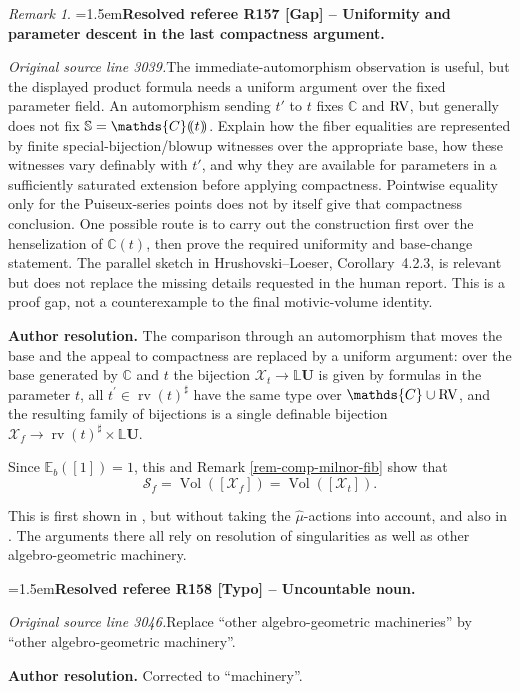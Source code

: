 \documentclass[12pt]{amsart}
\newcommand{\ResolvedRefereeRemark}[5]{%
  \par\medskip\begingroup\normalfont\small\color{gray}%
  \emergencystretch=1.5em\noindent\textbf{Resolved referee R#1 [#2] -- #3.}\par\nobreak\noindent #4\par
  \medskip\color{ResolutionGreen}\noindent\textbf{Author resolution.} #5\par
  \endgroup\medskip
}
\theoremstyle{plain}
\theoremstyle{definition}
\theoremstyle{remark}
\newtheorem{rem}[thm]{Remark}
\numberwithin{equation}{section}
\theoremstyle{plain}
\newcommand{\RV}{\textup{RV}}
\newcommand{\C}{\mathds{C}}
\newcommand{\0}{\emptyset}
\newcommand{\dpar}[1]{%
   (\mkern-4mu (#1 )\mkern-4mu )}
\newcommand{\mdl}[1]{\mathcal{#1}}  %
\newcommand{\bb}[1]{\mathbb{#1}}
\newcommand{\fun}{\longrightarrow}
\DeclareMathOperator{\rv}{rv}
\DeclareMathOperator{\Vol}{Vol}
\begin{document}
\begin{rem}
\ResolvedRefereeRemark{157}{Gap}{Uniformity and parameter descent in the last compactness argument}{%
\textit{Original source line 3039.}\quad The immediate-automorphism observation is useful, but the displayed product formula needs a uniform argument over the fixed parameter field. An automorphism sending $t'$ to $t$ fixes $\C$ and $\RV$, but generally does not fix $\mathbb S=\C\dpar t$. Explain how the fiber equalities are represented by finite special-bijection/blowup witnesses over the appropriate base, how these witnesses vary definably with $t'$, and why they are available for parameters in a sufficiently saturated extension before applying compactness. Pointwise equality only for the Puiseux-series points does not by itself give that compactness conclusion. One possible route is to carry out the construction first over the henselization of $\C(t)$, then prove the required uniformity and base-change statement. The parallel sketch in Hrushovski--Loeser, Corollary~4.2.3, is relevant but does not replace the missing details requested in the human report. This is a proof gap, not a counterexample to the final motivic-volume identity.
}{The comparison through an automorphism that moves the base and the appeal to compactness are replaced by a uniform argument: over the base generated by $\C$ and $t$ the bijection $\mdl X_t \fun \bb L \bm U$ is given by formulas in the parameter $t$, all $t^\prime \in \rv(t)^\sharp$ have the same type over $\C \cup \RV$, and the resulting family of bijections is a single definable bijection $\mdl X_f \fun \rv(t)^\sharp \times \bb L \bm U$.}
Since $\bb E_b([1]) = 1 $, this and Remark \ref{rem-comp-milnor-fib} show that
\[
\mathscr S_f  = \Vol([\mdl X_f]) = \Vol([\mdl X_t]).
\]


This is first shown in \cite{nicaise_ps_tropical}, but without taking the $\hat \mu$-actions into account, and also in \cite{Nic:Pay:trop:fub, forey_virtual_2017}. The arguments there all rely on resolution of singularities as well as other algebro-geometric machinery.

\ResolvedRefereeRemark{158}{Typo}{Uncountable noun}{%
\textit{Original source line 3046.}\quad Replace ``other algebro-geometric machineries'' by ``other algebro-geometric machinery''. 
}{Corrected to ``machinery''.}
\end{rem}
\end{document}
